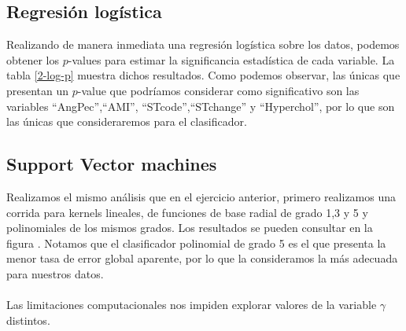 \documentclass[11pt]{article}
\begin{document}
\subsection{Regresión logística}
Realizando de manera inmediata una regresión logística sobre los datos, podemos obtener los $p$-values para estimar la significancia estadística de cada variable. La tabla \ref{2-log-p} muestra dichos resultados. Como podemos observar, las únicas que presentan un $p$-value que podríamos considerar como significativo son las variables ``AngPec'',``AMI'', ``STcode'',``STchange'' y ``Hyperchol'', por lo que son las únicas que consideraremos para el clasificador.
\subsection{Support Vector machines}
Realizamos el mismo análisis que en el ejercicio anterior, primero realizamos una corrida para kernels lineales, de funciones de base radial de grado 1,3 y 5 y polinomiales de los mismos grados. Los resultados se pueden consultar en la figura \label{2-svm-eq-sizeDependence}. Notamos que el clasificador polinomial de grado 5 es el que presenta la menor tasa de error global aparente, por lo que la consideramos la más adecuada para nuestros datos.
\\
\\Las limitaciones computacionales nos impiden explorar valores de la variable $\gamma$ distintos.
\end{document}
